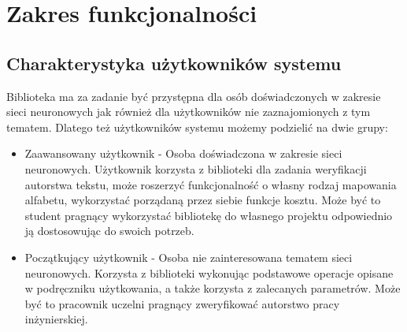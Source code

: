 \newpage
\section{Zakres funkcjonalności}

\subsection{Charakterystyka użytkowników systemu}
Biblioteka ma za zadanie być przystępna dla osób doświadczonych w zakresie sieci neuronowych jak również
dla użytkowników nie zaznajomionych z tym tematem. Dlatego też użytkowników systemu możemy podzielić 
na dwie grupy:
\begin{itemize}
 	\item Zaawansowany użytkownik - Osoba doświadczona w zakresie sieci neuronowych. Użytkownik korzysta
 	z biblioteki dla zadania weryfikacji autorstwa tekstu, może roszerzyć funkcjonalność o własny rodzaj
 	mapowania alfabetu, wykorzystać porządaną przez siebie funkcje kosztu. Może być to student pragnący
 	wykorzystać bibliotekę do własnego projektu odpowiednio ją dostosowując do swoich potrzeb.
 	\item Początkujący użytkownik - Osoba nie zainteresowana tematem sieci neuronowych. Korzysta z biblioteki
 	wykonując podstawowe operacje opisane w podręczniku użytkowania, a także korzysta z zalecanych parametrów.
 	Może być to pracownik uczelni pragnący zweryfikować autorstwo pracy inżynierskiej.
\end{itemize}

 
